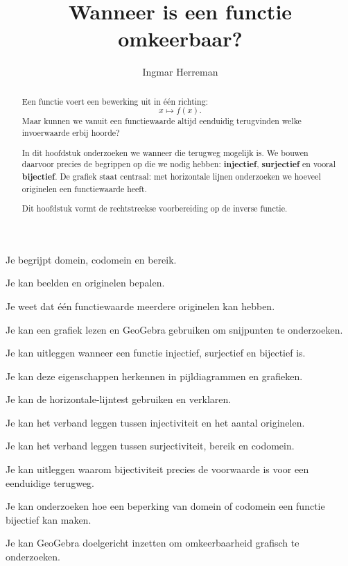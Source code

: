 \documentclass{ximera}
\title{Wanneer is een functie omkeerbaar?}
\author{Ingmar Herreman}
\begin{document}









\begin{abstract}
Een functie voert een bewerking uit in één richting:
\[
x\longmapsto f(x).
\]
Maar kunnen we vanuit een functiewaarde altijd eenduidig terugvinden welke
invoerwaarde erbij hoorde?

In dit hoofdstuk onderzoeken we wanneer die terugweg mogelijk is. We bouwen
daarvoor precies de begrippen op die we nodig hebben: \textbf{injectief},
\textbf{surjectief} en vooral \textbf{bijectief}. De grafiek staat centraal:
met horizontale lijnen onderzoeken we hoeveel originelen een functiewaarde heeft.

Dit hoofdstuk vormt de rechtstreekse voorbereiding op de inverse functie.
\end{abstract}

\maketitle

\begin{voorkennis}
    \item Je begrijpt domein, codomein en bereik.
    \item Je kan beelden en originelen bepalen.
    \item Je weet dat één functiewaarde meerdere originelen kan hebben.
    \item Je kan een grafiek lezen en GeoGebra gebruiken om snijpunten te onderzoeken.
\end{voorkennis}

\begin{leerdoelen}
    \item Je kan uitleggen wanneer een functie injectief, surjectief en bijectief is.
    \item Je kan deze eigenschappen herkennen in pijldiagrammen en grafieken.
    \item Je kan de horizontale-lijntest gebruiken en verklaren.
    \item Je kan het verband leggen tussen injectiviteit en het aantal originelen.
    \item Je kan het verband leggen tussen surjectiviteit, bereik en codomein.
    \item Je kan uitleggen waarom bijectiviteit precies de voorwaarde is voor een eenduidige terugweg.
    \item Je kan onderzoeken hoe een beperking van domein of codomein een functie bijectief kan maken.
    \item Je kan GeoGebra doelgericht inzetten om omkeerbaarheid grafisch te onderzoeken.
\end{leerdoelen}
\end{document}
